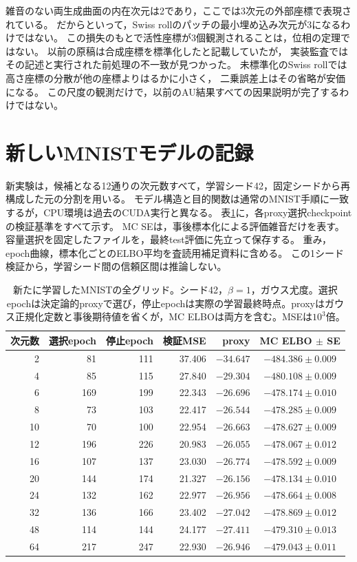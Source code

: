 \documentclass[11pt,a4paper]{ltjsarticle}
\begin{document}
雑音のない両生成曲面の内在次元は2であり，ここでは3次元の外部座標で表現されている。
だからといって，Swiss rollのパッチの最小埋め込み次元が3になるわけではない。
この損失のもとで活性座標が3個観測されることは，位相の定理ではない。
以前の原稿は合成座標を標準化したと記載していたが，
実装監査ではその記述と実行された前処理の不一致が見つかった。
未標準化のSwiss rollでは高さ座標の分散が他の座標よりはるかに小さく，
二乗誤差上はその省略が安価になる。
この尺度の観測だけで，以前のAU結果すべての因果説明が完了するわけではない。

\section{新しいMNISTモデルの記録}\label{app:newmodels}
新実験は，候補となる12通りの次元数すべて，学習シード42，固定シードから再構成した元の分割を用いる。
モデル構造と目的関数は通常のMNIST手順に一致するが，CPU環境は過去のCUDA実行と異なる。
表\ref{tab:mcgrid}に，各proxy選択checkpointの検証基準をすべて示す。
MC SEは，事後標本化による評価雑音だけを表す。
容量選択を固定したファイルを，最終test評価に先立って保存する。
重み，epoch曲線，標本化ごとのELBO平均を査読用補足資料に含める。
この1シード検証から，学習シード間の信頼区間は推論しない。
\begin{table}[H]
\caption{新たに学習したMNISTの全グリッド。シード42，$\beta=1$，ガウス尤度。選択epochは決定論的proxyで選び，停止epochは実際の学習最終時点。proxyはガウス正規化定数と事後期待値を省くが，MC ELBOは両方を含む。MSEは$10^3$倍。}\label{tab:mcgrid}
\small
\setlength{\tabcolsep}{3pt}
\begin{tabular*}{\textwidth}{@{\extracolsep{\fill}}rrrrrc@{}}
\toprule
次元数 & 選択epoch & 停止epoch & 検証MSE & proxy & MC ELBO $\pm$ SE \\
\midrule
2 & 81 & 111 & 37.406 & $-34.647$ & $-484.386 \pm 0.009$ \\
4 & 85 & 115 & 27.840 & $-29.304$ & $-480.108 \pm 0.009$ \\
6 & 169 & 199 & 22.343 & $-26.696$ & $-478.174 \pm 0.010$ \\
8 & 73 & 103 & 22.417 & $-26.544$ & $-478.285 \pm 0.009$ \\
10 & 70 & 100 & 22.954 & $-26.663$ & $-478.627 \pm 0.009$ \\
12 & 196 & 226 & 20.983 & $-26.055$ & $-478.067 \pm 0.012$ \\
16 & 107 & 137 & 23.030 & $-26.774$ & $-478.592 \pm 0.009$ \\
20 & 144 & 174 & 21.327 & $-26.156$ & $-478.134 \pm 0.010$ \\
24 & 132 & 162 & 22.977 & $-26.956$ & $-478.664 \pm 0.008$ \\
32 & 136 & 166 & 23.402 & $-27.042$ & $-478.869 \pm 0.012$ \\
48 & 114 & 144 & 24.177 & $-27.411$ & $-479.310 \pm 0.013$ \\
64 & 217 & 247 & 22.930 & $-26.946$ & $-479.043 \pm 0.011$ \\
\bottomrule\end{tabular*}
\end{table}
\end{document}
